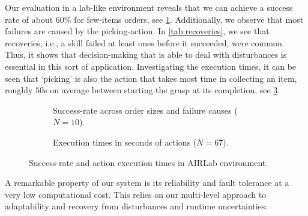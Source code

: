 
Our evaluation in a lab-like environment reveals that we can
achieve a success rate of about 60\% for few-items orders,
see \cref{fig:success_lab}. Additionally, we observe that
most failures are caused by the picking-action.
In \cref{tab:recoveries}, we see that recoveries, i.e., a skill failed at least ones before it succeeded, were common. Thus, it shows that decision-making that is able to deal with disturbances is essential in this sort of application.
Investigating the 
execution times, it can be seen that `picking' is also the action
that takes most time in collecting an item, roughly $50$s on average between starting the grasp at its completion, 
see \cref{fig:timings_lab}.
\begin{figure}
\begin{subfigure}[b]{0.5\linewidth}
    \centering
    
    \caption{Success-rate across order sizes and failure causes ($N=10$).}
    \label{fig:success_lab}
  \end{subfigure}
\begin{subfigure}[b]{0.5\linewidth}
    \centering%
     
    \caption{Execution times in seconds of actions ($N=67$).}
    \label{fig:timings_lab}
  \end{subfigure}
  \caption{Success-rate and action execution times in AIRLab environment.}
\end{figure}

A remarkable property of our system is its reliability and fault tolerance at a very low computational cost. This relies on our multi-level approach to adaptability and recovery from disturbances and runtime uncertainties:
